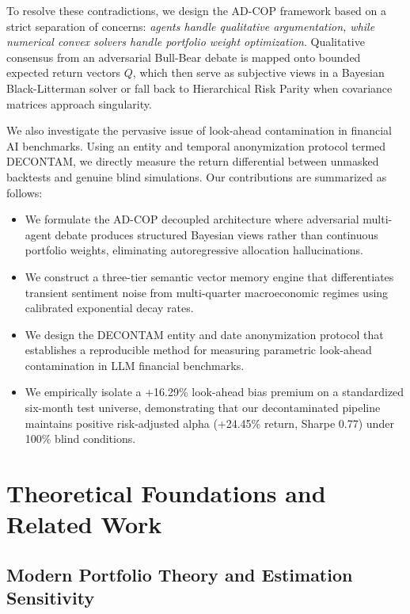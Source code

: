 \documentclass[conference]{IEEEtran}
\begin{document}
To resolve these contradictions, we design the AD-COP framework based on a strict separation of concerns: \textit{agents handle qualitative argumentation, while numerical convex solvers handle portfolio weight optimization}. Qualitative consensus from an adversarial Bull-Bear debate is mapped onto bounded expected return vectors $Q$, which then serve as subjective views in a Bayesian Black-Litterman solver \cite{black1992} or fall back to Hierarchical Risk Parity \cite{prado2016} when covariance matrices approach singularity.

We also investigate the pervasive issue of look-ahead contamination in financial AI benchmarks. Using an entity and temporal anonymization protocol termed DECONTAM, we directly measure the return differential between unmasked backtests and genuine blind simulations. Our contributions are summarized as follows:

\begin{itemize}
    \item We formulate the AD-COP decoupled architecture where adversarial multi-agent debate produces structured Bayesian views rather than continuous portfolio weights, eliminating autoregressive allocation hallucinations.
    \item We construct a three-tier semantic vector memory engine that differentiates transient sentiment noise from multi-quarter macroeconomic regimes using calibrated exponential decay rates.
    \item We design the DECONTAM entity and date anonymization protocol that establishes a reproducible method for measuring parametric look-ahead contamination in LLM financial benchmarks.
    \item We empirically isolate a +16.29\% look-ahead bias premium on a standardized six-month test universe, demonstrating that our decontaminated pipeline maintains positive risk-adjusted alpha (+24.45\% return, Sharpe 0.77) under 100\% blind conditions.
\end{itemize}

\section{Theoretical Foundations and Related Work}

\subsection{Modern Portfolio Theory and Estimation Sensitivity}
\end{document}
